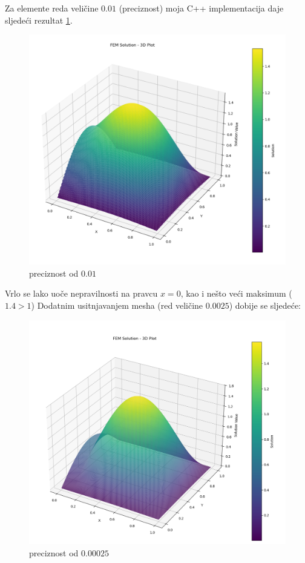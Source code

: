 \documentclass[zavrsnirad]{../fer}
\begin{document}
\newpage
Za elemente reda veličine $0.01$ (preciznost) moja C++ implementacija daje sljedeći 
rezultat \ref{numerSinSin001}.
\begin{figure}[H]
	\centering
  \includegraphics[width=1.2\linewidth]{Figures/numersinsin001.png}
	\caption{preciznost od $0.01$}
  \label{numerSinSin001}
\end{figure}
Vrlo se lako uoče nepravilnosti na pravcu $x=0$, 
kao i nešto veći maksimum ($1.4 > 1$)
\newpage
Dodatnim usitnjavanjem mesha (red veličine $0.0025$)
dobije se sljedeće:
\begin{figure}[H]
	\centering
	\includegraphics[width=1.2\linewidth]{Figures/numersinsin00025.png}
	\caption{preciznost od $0.00025$}
  \label{numerSinSin00025}
\end{figure}
\end{document}
